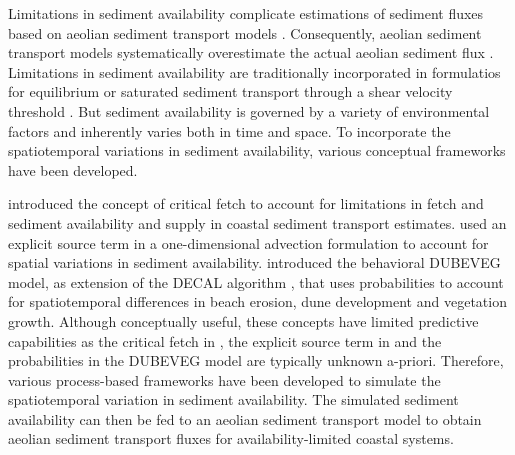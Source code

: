 Limitations in sediment availability complicate estimations of
sediment fluxes based on aeolian sediment transport models
\citep[e.g.][]{Jackson1999, Lynch2008, DavidsonArnott2009,
  Aagaard2014}. Consequently, aeolian sediment transport models
systematically overestimate the actual aeolian sediment flux
\citep{Sherman1998, Sherman2012}. Limitations in sediment availability
are traditionally incorporated in formulatios for equilibrium or
saturated sediment transport through a shear velocity threshold
\citep[e.g.][]{Howard1977, Dyer1986, Belly1964, Johnson1965,
  Hotta1984, Nickling1981, Arens1996, King2005}. But sediment
availability is governed by a variety of environmental factors and
inherently varies both in time and space. To incorporate the
spatiotemporal variations in sediment availability, various conceptual
frameworks have been developed.

\citet{Bauer2002} introduced the concept of critical fetch to account
for limitations in fetch and sediment availability and supply in
coastal sediment transport estimates. \citet{deVries2014b} used an
explicit source term in a one-dimensional advection formulation to
account for spatial variations in sediment
availability. \citet{Keijsers2016} introduced the behavioral DUBEVEG
model, as extension of the DECAL algorithm \citep{Baas2002}, that uses
probabilities to account for spatiotemporal differences in beach
erosion, dune development and vegetation growth. Although conceptually
useful, these concepts have limited predictive capabilities as the
critical fetch in \citet{Bauer2002}, the explicit source term in
\citet{deVries2014b} and the probabilities in the DUBEVEG model are
typically unknown a-priori. Therefore, various process-based
frameworks have been developed to simulate the spatiotemporal
variation in sediment availability. The simulated sediment
availability can then be fed to an aeolian sediment transport model to
obtain aeolian sediment transport fluxes for availability-limited
coastal systems.

